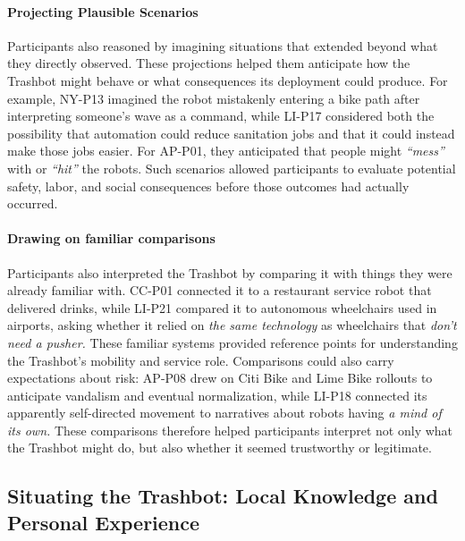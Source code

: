 \paragraph{Projecting Plausible Scenarios}
Participants also reasoned by imagining situations that extended beyond what they directly observed. These projections helped them anticipate how the Trashbot might behave or what consequences its deployment could produce. For example, NY-P13 imagined the robot mistakenly entering a bike path after interpreting someone's wave as a command, while LI-P17 considered both the possibility that automation could reduce sanitation jobs and that it could instead make those jobs easier. For AP-P01, they anticipated that people might \emph{``mess''} with or \emph{``hit''} the robots. Such scenarios allowed participants to evaluate potential safety, labor, and social consequences before those outcomes had actually occurred.

\paragraph{Drawing on familiar comparisons}
Participants also interpreted the Trashbot by comparing it with things they were already familiar with. CC-P01 connected it to a restaurant service robot that delivered drinks, while LI-P21 compared it to autonomous wheelchairs used in airports, asking whether it relied on \emph{the same technology} as wheelchairs that \emph{don't need a pusher.} These familiar systems provided reference points for understanding the Trashbot's mobility and service role. Comparisons could also carry expectations about risk: AP-P08 drew on Citi Bike and Lime Bike rollouts to anticipate vandalism and eventual normalization, while LI-P18 connected its apparently self-directed movement to narratives about robots having \emph{a mind of its own.} These comparisons therefore helped participants interpret not only what the Trashbot might do, but also whether it seemed trustworthy or legitimate.


\subsection{Situating the Trashbot: Local Knowledge and Personal Experience}
\label{sec:site-sensemaking}

